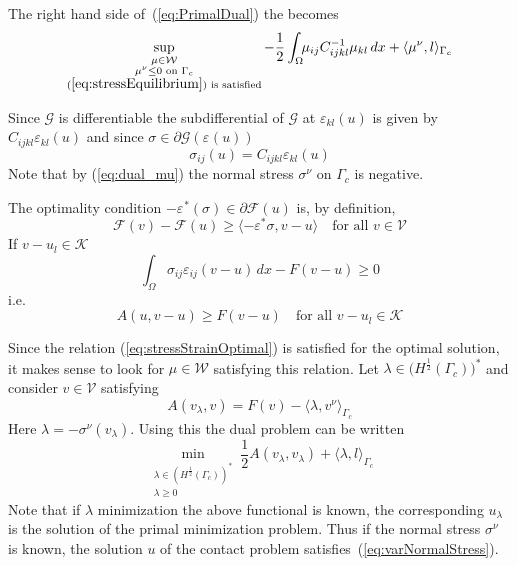\documentclass[12pt,a4paper]{article}
\numberwithin{equation}{section}
\numberwithin{table}{section}
\numberwithin{figure}{section}
\newcommand{\W}{\ensuremath{\mathcal{W}}}
\newcommand{\half}{\ensuremath{\frac{1}{2}}}
\newcommand{\V}{\ensuremath{\mathcal{V}}}
\newcommand{\K}{\ensuremath{\mathcal{K}}}
\newcommand{\F}{\ensuremath{{\mathcal F}}}
\newcommand{\G}{\ensuremath{{\mathcal G}}}
\newcommand{\intO}{\int_\Omega\!\!}
\renewcommand{\epsilon}{\varepsilon}
\newcommand{\strain}[1][]{\ensuremath{\epsilon_{#1}}}
\newcommand{\epsij}{\strain[ij]}
\newcommand{\epskl}{\strain[kl]}
\newcommand{\stress}[1][]{\ensuremath{\sigma_{#1}}}
\newcommand{\sigij}{\stress[ij]}
\providecommand{\dualp}[2]{\langle #1, #2 \rangle}
\newcommand{\dx}{{\,dx}}
\begin{document}
The right hand side of~(\ref{eq:PrimalDual}) the becomes
\begin{equation}
  \label{eq:dual_mu}
  \sup_{\substack{
      \mu\in \W\\
      \mu^\nu \le 0 \text{ on }\Gamma_c\\
      (\ref{eq:stressEquilibrium})\text{ is satisfied}
    }}
    -\half\intO \mu_{ij} C^{-1}_{ijkl} \mu_{kl} \dx
  + \dualp{\mu^\nu}{l}_{\Gamma_c}
\end{equation}

Since $\G$ is differentiable the subdifferential of $\G$ at
$\epskl(u)$ is given by $C_{ijkl} \epskl(u)$ and since $\sigma\in
\partial \G(\strain(u))$
\begin{equation}
  \label{eq:stressStrainOptimal}
  \sigij(u) = C_{ijkl} \epskl(u)
\end{equation}
Note that by (\ref{eq:dual_mu}) the normal stress $\sigma^\nu$ on $\Gamma_c$ is negative.
 

The optimality condition $-\strain^*(\sigma) \in \partial \F(u)$
is, by definition,
\begin{equation}
  \F(v) - \F(u) \ge \dualp{-\epsilon^* \sigma}{v-u} \quad\text{for all $v\in \V$}
\end{equation}
If $v-u_l\in \K$
\begin{equation}
  \int_{\Omega}\!\! \sigij \epsij(v-u) \dx - F(v-u) \ge 0
\end{equation}
i.e.\
\begin{equation}
  A(u, v-u) \ge F(v-u) \quad\text{for all $v-u_l\in \K$}
\end{equation}

Since the relation (\ref{eq:stressStrainOptimal}) is satisfied for the optimal solution,
it makes sense to look for $\mu\in\W$ satisfying this relation.  Let $\lambda \in
\bigl(H^\half(\Gamma_c)\bigr)^*$ and consider $v \in \V$ satisfying
\begin{equation}
  \label{eq:varNormalStress}
  A(v_\lambda, v) = F(v) - \dualp{\lambda}{v^\nu}_{\Gamma_c}
\end{equation}
Here $\lambda = -\sigma^\nu(v_\lambda)$.  Using this the dual problem can be written
\begin{equation}
  \min_{\substack{
      \lambda\in ( H^\half(\Gamma_c) )^* \\
      \lambda \ge 0}
  } \half A(v_\lambda, v_\lambda) + \dualp{\lambda}{l}_{\Gamma_c}
\end{equation}
Note that if $\lambda$ minimization the above functional is known, the corresponding
$u_\lambda$ is the solution of the primal minimization problem.  Thus if the normal stress
$\sigma^\nu$ is known, the solution $u$ of the contact problem
satisfies~(\ref{eq:varNormalStress}).
\end{document}

